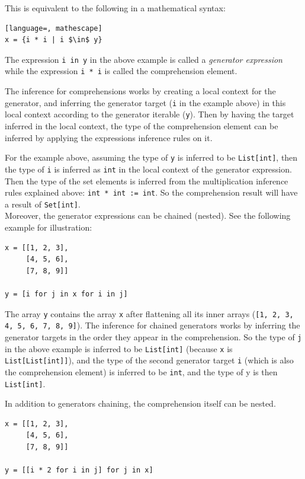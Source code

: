 This is equivalent to the following in a mathematical syntax:
\begin{lstlisting}[language=, mathescape]
x = {i * i | i $\in$ y}
\end{lstlisting}

The expression \lstinline|i in y| in the above example is called a \textit{generator expression} while the expression \lstinline|i * i| is called the comprehension element.

The inference for comprehensions works by creating a local context for the generator, and inferring the generator target (\lstinline|i| in the example above) in this local context according to the generator iterable (\lstinline|y|). Then by having the target inferred in the local context, the type of the comprehension element can be inferred by applying the expressions inference rules on it.

For the example above, assuming the type of \lstinline|y| is inferred to be \lstinline|List[int]|, then the type of \lstinline|i| is inferred as \lstinline|int| in the local context of the generator expression. Then the type of the set elements is inferred from the multiplication inference rules explained above: \lstinline|int * int := int|. So the comprehension result will have a result of \lstinline|Set[int]|. \\

Moreover, the generator expressions can be chained (nested). See the following example for illustration:

\begin{lstlisting}
x = [[1, 2, 3],
     [4, 5, 6],
     [7, 8, 9]]
	 
y = [i for j in x for i in j]
\end{lstlisting}

The array \lstinline|y| contains the array \lstinline|x| after flattening all its inner arrays (\lstinline|[1, 2, 3, 4, 5, 6, 7, 8, 9]|). The inference for chained generators works by inferring the generator targets in the order they appear in the comprehension. So the type of \lstinline|j| in the above example is inferred to be \lstinline|List[int]| (because \lstinline|x| is \lstinline|List[List[int]]|), and the type of the second generator target \lstinline|i| (which is also the comprehension element) is inferred to be \lstinline|int|, and the type of y is then \lstinline|List[int]|.

In addition to generators chaining, the comprehension itself can be nested.
\begin{lstlisting}
x = [[1, 2, 3],
     [4, 5, 6],
     [7, 8, 9]]
	 
y = [[i * 2 for i in j] for j in x]	 
\end{lstlisting}

